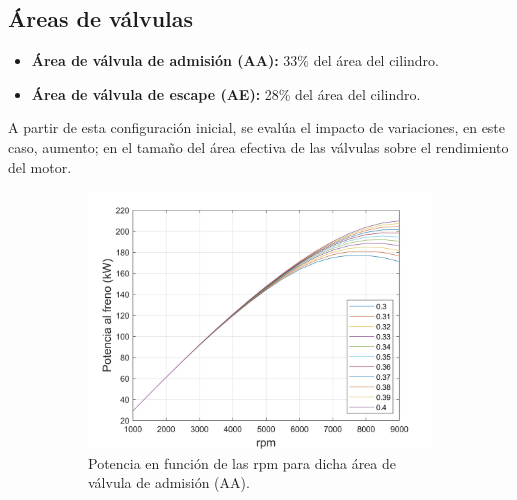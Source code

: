 \subsection{Áreas de válvulas} \label{s:subsection_02}
\begin{itemize}
   \item \textbf{Área de válvula de admisión (AA):} 33\%  del área del cilindro.
  \item \textbf{Área de válvula de escape (AE):} 28\%  del área del cilindro.
  \end{itemize}

A partir de esta configuración inicial, se evalúa el impacto de variaciones, en este caso, aumento; en el tamaño del área efectiva de las válvulas sobre el rendimiento del motor.

\begin{figure}[H]
    \centering
    \begin{subfigure}[b]{0.45\textwidth}
        \centering
        \includegraphics[width=\linewidth]{Figures/01/Potencia_rpm_aval_admision.jpg}
        \caption{Potencia en función de las rpm para dicha área de válvula de admisión (AA).}
        \label{fig:RPM_aval_admision}
    \end{subfigure}
    \hfill
    \begin{subfigure}[b]{0.45\textwidth}
        \centering

\end{subfigure}
\end{figure}
